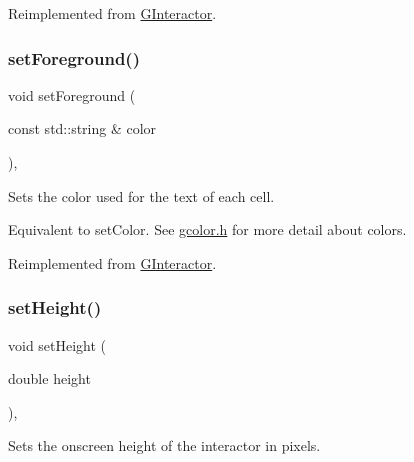 Reimplemented from \mbox{\hyperlink{classsgl_1_1GInteractor_a9eb856b5ff83a19df3831a31f15f4563}{G\+Interactor}}.

\mbox{\label{classsgl_1_1GTable_a8afbcf1f47750fb4c717f9ff36540235}} 
\subsubsection{\texorpdfstring{set\+Foreground()}{setForeground()}\hspace{0.1cm}{\footnotesize\ttfamily [2/2]}}
{\footnotesize\ttfamily void set\+Foreground (\begin{DoxyParamCaption}\item[{const std\+::string \&}]{color }\end{DoxyParamCaption})\hspace{0.3cm}{\ttfamily [override]}, {\ttfamily [virtual]}}



Sets the color used for the text of each cell. 

Equivalent to set\+Color. See \mbox{\hyperlink{gcolor_8h_source}{gcolor.\+h}} for more detail about colors. 

Reimplemented from \mbox{\hyperlink{classsgl_1_1GInteractor_af59209aeadea6dfc6d97a2d8531f50e1}{G\+Interactor}}.

\mbox{\label{classsgl_1_1GInteractor_a9e280bfc4544dfaf8e4376c4e1a74357}} 
\subsubsection{\texorpdfstring{set\+Height()}{setHeight()}}
{\footnotesize\ttfamily void set\+Height (\begin{DoxyParamCaption}\item[{double}]{height }\end{DoxyParamCaption})\hspace{0.3cm}{\ttfamily [virtual]}, {\ttfamily [inherited]}}



Sets the onscreen height of the interactor in pixels. 


